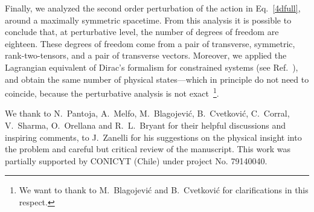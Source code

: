 \documentclass[aps,prd,12pt,twocolumn,superscriptaddress,showpacs,showkeys,reprint%
]{revtex4-1}
\renewcommand{\(}{\left(}
\renewcommand{\)}{\right)}
\renewcommand{\[}{\left[}
\renewcommand{\]}{\right]}
\begin{document}
Finally, we analyzed the second order perturbation of the action in Eq.~\eqref{4dfull}, around a maximally symmetric spacetime. From this analysis it is possible to conclude that, at perturbative level, the number of degrees of freedom are eighteen. These degrees of freedom come from a pair of transverse, symmetric, rank-two-tensors, and a pair of transverse vectors. Moreover, we applied the Lagrangian equivalent of Dirac's formalism for constrained systems (see Ref.~\cite{Diaz:2014yua}), and obtain the same number of physical states---which in principle do not need to coincide, because the perturbative analysis is not exact~\footnote{We want to thank to M.~Blagojevi\'c and B.~Cvetkovi\'c for clarifications in this respect.}.


\begin{acknowledgments}
  We thank to N.~Pantoja, A.~Melfo, M.~Blagojevi\'c, B.~Cvetkovi\'c, C.~Corral, V.~Sharma, O.~Orellana and R.~L.~Bryant for their helpful discussions and inspiring comments, to J.~Zanelli for his suggestions on the physical insight into the problem and careful but critical review of the manuscript.
  This work was partially supported by CONICYT (Chile) under project No. 79140040.
\end{acknowledgments}

\appendix





\end{document}
